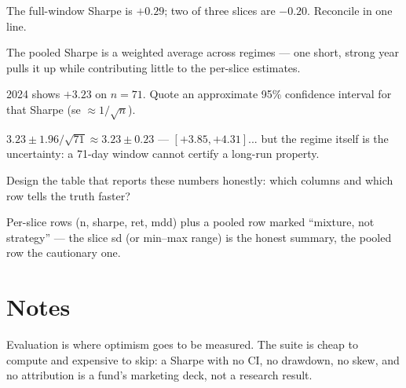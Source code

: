 \begin{exercise}[easy]
The full-window Sharpe is $+0.29$; two of three slices are
$-0.20$. Reconcile in one line.
\end{exercise}
\begin{solution}
The pooled Sharpe is a weighted average across regimes --- one
short, strong year pulls it up while contributing little to the
per-slice estimates.
\end{solution}
\begin{exercise}[medium]
2024 shows $+3.23$ on $n=71$. Quote an approximate 95\%
confidence interval for that Sharpe (se $\approx1/\sqrt{n}$).
\end{exercise}
\begin{solution}
$3.23\pm1.96/\sqrt{71}\approx3.23\pm0.23$ ---
$[+3.85,+4.31]$... but the regime itself is the uncertainty: a
71-day window cannot certify a long-run property.
\end{solution}
\begin{exercise}[hard]
Design the table that reports these numbers honestly: which
columns and which row tells the truth faster?
\end{exercise}
\begin{solution}
Per-slice rows (n, sharpe, ret, mdd) plus a pooled row marked
``mixture, not strategy'' --- the slice sd (or min--max range)
is the honest summary, the pooled row the cautionary one.
\end{solution}

\section*{Notes}
Evaluation is where optimism goes to be measured. The suite is cheap to compute and
expensive to skip: a Sharpe with no CI, no drawdown, no skew, and no attribution is a
fund's marketing deck, not a research result.

